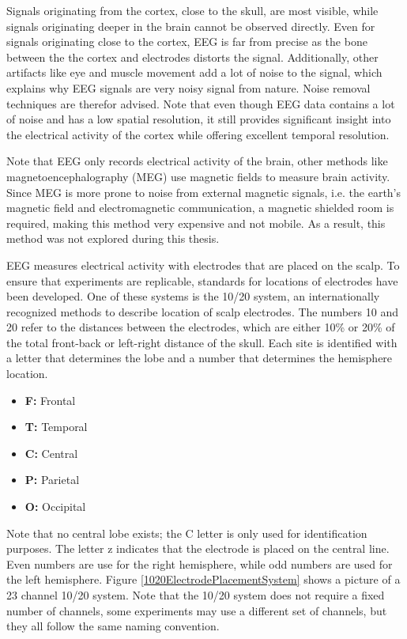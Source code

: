 \npar

Signals originating from the cortex, close to the skull, are most visible, while signals originating deeper in the brain cannot be observed directly. Even for signals originating close to the cortex, EEG is far from precise as the bone between the the cortex and electrodes distorts the signal. Additionally, other artifacts like eye and muscle movement add a lot of noise to the signal, which explains why EEG signals are very noisy signal from nature. Noise removal techniques are therefor advised. Note that even though EEG data contains a lot of noise and has a low spatial resolution, it still provides significant insight into the electrical activity of the cortex while offering excellent temporal resolution\cite{GivenPaper}.

\npar

Note that EEG only records electrical activity of the brain, other methods like magnetoencephalography (MEG) use magnetic fields to measure brain activity. Since MEG is more prone to noise from external magnetic signals, i.e. the earth's magnetic field and electromagnetic communication, a magnetic shielded room is required, making this method very expensive and not mobile. As a result, this method was not explored during this thesis.

\npar

EEG measures electrical activity with electrodes that are placed on the scalp. To ensure that experiments are replicable, standards for locations of electrodes have been developed. One of these systems is the 10/20 system, an internationally recognized methods to describe location of scalp electrodes\cite{TenTwentyManual}. The numbers 10 and 20 refer to the distances between the electrodes, which are either 10\% or 20\% of the total front-back or left-right distance of the skull. Each site is identified with a letter that determines the lobe and a number that determines the hemisphere location.
\begin{itemize}
\item \textbf{F:} Frontal
\item \textbf{T:} Temporal
\item \textbf{C:} Central
\item \textbf{P:} Parietal
\item \textbf{O:} Occipital
\end{itemize}
Note that no central lobe exists; the C letter is only used for identification purposes. The letter z indicates that the electrode is placed on the central line. Even numbers are use for the right hemisphere, while odd numbers are used for the left hemisphere. Figure \ref{1020ElectrodePlacementSystem} shows a picture of a 23 channel 10/20 system. Note that the 10/20 system does not require a fixed number of channels, some experiments may use a different set of channels, but they all follow the same naming convention.

